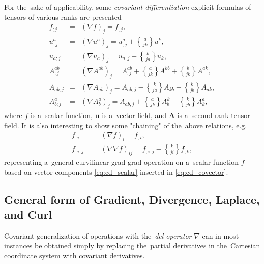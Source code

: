 \documentclass[preprint,12pt]{elsarticle}
\newcommand{\vect}[1]{\boldsymbol{#1}}
\newcommand{\matr}[1]{\mathbf{#1}}
\newcommand{\christ}[3]{\genfrac{\{}{\}}{0pt}{}{#1}{#2 #3}}
\newcounter{bla}
\begin{document}
For the~sake of applicability, some \textit{covariant differentiation}
explicit formulas of tensors of various ranks are presented
\begin{eqnarray}
  f_{;j} &=& (\nabla f)_j = f_{,j} , \label{eq:cd_scalar}\\
  u^a_{;j} &=& (\nabla u^a)_j = u^a_{,j} + \christ{a}{j}{k} u^k , 
  \label{eq:cd_contravector} \\
  u_{a;j} &=& (\nabla u_a)_j = u_{a,j} - \christ{k}{j}{a} u_k , 
  \label{eq:cd_covector} \\
  A^{ab}_{;j} &=& (\nabla A^{ab})_j = A^{ab}_{,j} + \christ{a}{j}{k} A^{kb} 
  + \christ{b}{j}{k} A^{ak} , 
  \label{eq:cd_contratensor} \\
  A_{ab;j} &=& (\nabla A_{ab})_j = A_{ab,j} - \christ{k}{j}{a} A_{kb} 
  - \christ{k}{j}{b} A_{ak} ,
  \label{eq:cd_cotensor} \\
  A^a_{b;j} &=& (\nabla A^a_{b})_j = A_{ab,j} + \christ{a}{j}{k} A^k_b
  - \christ{k}{j}{b} A^a_k ,
  \label{eq:cd_mixedtensor}
\end{eqnarray} 
where $f$ is a~scalar function, $\vect{u}$ is a~vector field, and
$\matr{A}$ is a~second rank tensor field.
It is also interesting to show some "chaining" of the~above relations, e.g.
\begin{eqnarray}
  f_{;i} &=& (\nabla f)_i = f_{,i} , \nonumber\\
  f_{;i;j} &=& (\nabla\nabla f)_{ij} = f_{,i,j} - \christ{k}{j}{i} f_{,k} , 
  \label{eq:cd_gradgrad}
\end{eqnarray} 
representing a~general curvilinear grad grad operation on a~scalar function $f$
based on vector components \eqref{eq:cd_scalar} inserted in 
\eqref{eq:cd_covector}.

\subsection{General form of Gradient, Divergence, Laplace, and Curl}
Covariant generalization of operations with the~\textit{del operator} $\nabla$
can in most instances be obtained simply by replacing the~partial derivatives
in the~Cartesian coordinate system with covariant derivatives.
\end{document}
